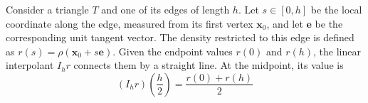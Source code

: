 \documentclass[11pt,a4paper]{article}
\begin{document}
\noindent
\begin{minipage}[c]{0.35\linewidth}
\vspace{-1 cm}
    \centering
    \resizebox{0.8\linewidth}{!}{%
    }
\end{minipage}%
\hfill
\begin{minipage}[c]{0.62\linewidth}

    Consider a triangle $T$ and one of its edges
    of length $h$.
    Let $s\in[0,h]$ be the local coordinate
    along the edge, measured from its first
    vertex $\mathbf{x}_0$, and let $\mathbf{e}$
    be the corresponding unit tangent vector.
    The density restricted to this edge is
    defined as
    \(
        r(s)=\rho(\mathbf{x}_0+s\mathbf{e}).
    \)
    Given the endpoint values $r(0)$ and
    $r(h)$, the linear interpolant $I_h r$
    connects them by a straight line.
    At the midpoint, its value is
    \begin{equation}
        \boxed{
        \left(I_h r\right)\left(\frac{h}{2}\right)
        =\frac{r(0)+r(h)}{2}
        }
    \end{equation}
    \vspace{6pt}

\end{minipage}


\end{document}
